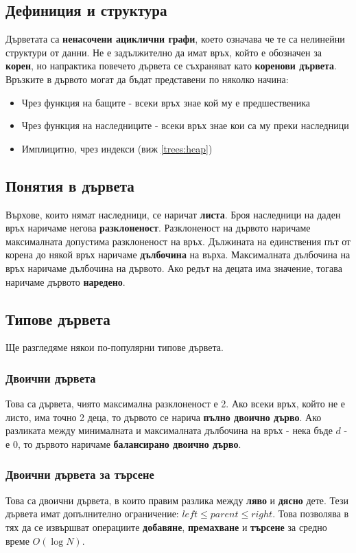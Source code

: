 \documentclass[fleqn,12pt]{article}
\begin{document}
\subsection{Дефиниция и структура}
Дърветата са \textbf{ненасочени ациклични графи}, което означава че те са нелинейни структури от данни. Не е задължително да имат връх, който е обозначен за \textbf{корен}, но
напрактика повечето дървета се съхраняват като \textbf{коренови дървета}. Връзките в дървото могат да бъдат представени по няколко начина:
\begin{itemize}
    \item Чрез функция на бащите - всеки връх знае кой му е предшественика
    \item Чрез функция на наследниците - всеки връх знае кои са му преки наследници
    \item Имплицитно, чрез индекси (виж \ref{trees:heap})
\end{itemize}

\subsection{Понятия в дървета}
Върхове, които нямат наследници, се наричат \textbf{листа}. Броя наследници на даден връх наричаме негова \textbf{разклоненост}.
Разклоненост на дървото наричаме максималната допустима разклоненост на връх. Дължината на единствения път от корена до някой връх
наричаме \textbf{дълбочина} на върха. Максималната дълбочина на връх наричаме дълбочина на дървото. Ако редът на децата има значение,
тогава наричаме дървото \textbf{наредено}.

\subsection{Типове дървета}
Ще разгледяме някои по-популярни типове дървета.

\subsubsection{Двоични дървета}
Това са дървета, чиято максимална разклоненост е 2. Ако всеки връх, който не е листо, има точно 2 деца,
то дървото се нарича \textbf{пълно двоично дърво}. Ако разликата между минималната и максималната дълбочина на връх - нека бъде $d$ - е 0, 
то дървото наричаме \textbf{балансирано двоично дърво}.

\subsubsection{Двоични дървета за търсене}
Това са двоични дървета, в които правим разлика между \textbf{ляво} и \textbf{дясно} дете.
Тези дървета имат допълнително ограничение: $left \leq parent \leq right$. 
Това позволява в тях да се извършват операциите \textbf{добавяне}, \textbf{премахване} и \textbf{търсене} за средно време $O(\log N)$.
\end{document}
